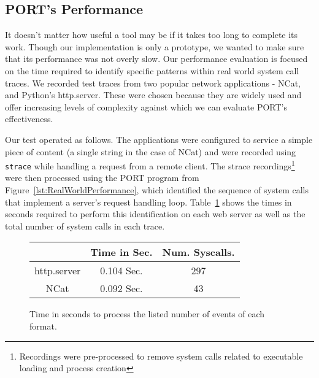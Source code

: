 \subsection{PORT's Performance}

It doesn't matter how useful a tool may be
if it takes too long to complete its work.
Though our implementation is
only a prototype, we wanted to make sure that its performance was not
overly slow.
Our performance evaluation
is focused on the time required
to identify specific
patterns within real world system call traces.
We recorded test traces
from two popular network applications -
NCat,
and
Python's http.server.
These
were chosen because they are widely used and
offer increasing levels of complexity against which we can evaluate
PORT's effectiveness.

Our test operated as follows.  The applications were configured to service
a simple piece of content (a single string in the case of NCat) and were
recorded using {\tt strace} while handling a request from a remote client.
The strace
recordings\footnote{Recordings were pre-processed to remove system calls
related to executable loading and process creation} were then processed using the PORT program from
Figure~\ref{lst:RealWorldPerformance},  which
identified the sequence of system calls that implement
a server's request handling
loop.  Table~\ref{tbl:RealWorldPerformance}
shows the times in seconds required to perform this identification on each
web server as well as the total number of system calls in each trace.

\begin{figure}
  \begin{tabular}{|c|c|c}
                & Time in Sec. & Num. Syscalls.\\
              \hline
  http.server   & 0.104 Sec.   & 297   \\
  NCat          & 0.092 Sec.   & 43      \\
\end{tabular}
\caption{Time in seconds to process the listed number of events of each format.}
\label{tbl:RealWorldPerformance}
\end{figure}


